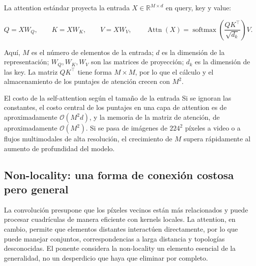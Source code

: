 La attention estándar proyecta la entrada $X\in\mathbb{R}^{M\times d}$ en query, key y value:

\[
Q=XW_Q,\qquad K=XW_K,\qquad V=XW_V,
\qquad
\operatorname{Attn}(X)=\operatorname{softmax}\!\left(\frac{QK^\top}{\sqrt{d_k}}\right)V.
\]

Aquí, $M$ es el número de elementos de la entrada; $d$ es la dimensión de la representación; $W_Q,W_K,W_V$ son las matrices de proyección; $d_k$ es la dimensión de las key. La matriz $QK^\top$ tiene forma $M\times M$, por lo que el cálculo y el almacenamiento de los puntajes de atención crecen con $M^2$.


\begin{importantbox}{El costo de la self-attention según el tamaño de la entrada}
Si se ignoran las constantes, el costo central de los puntajes en una capa de attention es de aproximadamente $\mathcal{O}(M^2d)$, y la memoria de la matriz de atención, de aproximadamente $\mathcal{O}(M^2)$. Si se pasa de imágenes de $224^2$ píxeles a video o a flujos multimodales de alta resolución, el crecimiento de $M$ supera rápidamente al aumento de profundidad del modelo.
\end{importantbox}

\subsection{Non-locality: una forma de conexión costosa pero general}

La convolución presupone que los píxeles vecinos están más relacionados y puede procesar cuadrículas de manera eficiente con kernels locales. La attention, en cambio, permite que elementos distantes interactúen directamente, por lo que puede manejar conjuntos, correspondencias a larga distancia y topologías desconocidas. El ponente considera la non-locality un elemento esencial de la generalidad, no un desperdicio que haya que eliminar por completo.



